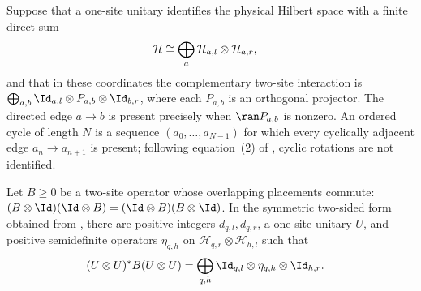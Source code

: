 \begin{definition}\label{def:beigi_sector_graph}
    \leanok
    Suppose that a one-site unitary identifies the physical Hilbert space with
    a finite direct sum
    \begin{align}
        \mathcal H
         & \cong
        \bigoplus_a
        \mathcal H_{a,l}\otimes\mathcal H_{a,r},
        \notag
    \end{align}
    and that in these coordinates the complementary two-site interaction is
    $\bigoplus_{a,b}\Id_{a,l}\otimes P_{a,b}\otimes\Id_{b,r}$, where each
    $P_{a,b}$ is an orthogonal projector. The directed edge
    $a\to b$ is present precisely when $\ran P_{a,b}$ is nonzero.
    An ordered cycle of length $N$ is a sequence $(a_0,\ldots,a_{N-1})$ for
    which every cyclically adjacent edge $a_n\to a_{n+1}$ is present; following
    equation~(2) of \cite[Section~III]{Beigi2012Classification}, cyclic
    rotations are not identified.
\end{definition}

\begin{lemma}
    \label{thm:commuting_positive_interaction_symmetric_spatial_form}
    \leanok
    Let $B\geq0$ be a two-site operator whose overlapping placements commute:
    $(B\otimes\Id)(\Id\otimes B) = (\Id\otimes B)(B\otimes\Id)$.
    In the symmetric two-sided form obtained from
    \cite[Lemma~2.1 and Section~III, equation~(2)]{Beigi2012Classification},
    there are positive integers $d_{q,l},d_{q,r}$, a one-site unitary $U$,
    and positive semidefinite operators $\eta_{q,h}$ on
    $\mathcal H_{q,r}\otimes\mathcal H_{h,l}$ such that
    \begin{align}
        (U\otimes U)^*B(U\otimes U)
         & =
        \bigoplus_{q,h}
        \Id_{q,l}\otimes\eta_{q,h}\otimes\Id_{h,r}.
        \notag
    \end{align}
\end{lemma}

